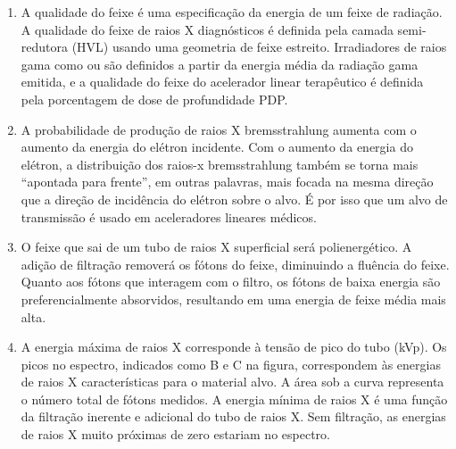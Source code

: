 \documentclass[11pt,a4paper]{article}
\begin{document}
\begin{enumerate}
        \item A qualidade do feixe é uma especificação da energia de um feixe de radiação. A qualidade do feixe de raios X diagnósticos é definida pela camada semi-redutora (HVL) usando uma geometria de feixe estreito. Irradiadores de raios gama como  ou  são definidos a partir da energia média da radiação gama emitida, e a qualidade do feixe do acelerador linear terapêutico é definida pela porcentagem de dose de profundidade PDP.
        
        \item A probabilidade de produção de raios X bremsstrahlung aumenta com o aumento da energia do elétron incidente. Com o aumento da energia do elétron, a distribuição dos raios-x bremsstrahlung também se torna mais “apontada para frente”, em outras palavras, mais focada na mesma direção que a direção de incidência do elétron sobre o alvo. É por isso que um alvo de transmissão é usado em aceleradores lineares médicos.
        
        \item O feixe que sai de um tubo de raios X superficial será polienergético. A adição de filtração removerá os fótons do feixe, diminuindo a fluência do feixe. Quanto aos fótons que interagem com o filtro, os fótons de baixa energia são preferencialmente absorvidos, resultando em uma energia de feixe média mais alta.
        
        \item A energia máxima de raios X corresponde à tensão de pico do tubo (kVp). Os picos no espectro, indicados como B e C na figura, correspondem às energias de raios X características para o material alvo. A área sob a curva representa o número total de fótons medidos. A energia mínima de raios X é uma função da filtração inerente e adicional do tubo de raios X. Sem filtração, as energias de raios X muito próximas de zero estariam no espectro.
        
            \begin{center}
            \end{center}
        

\end{enumerate}
\end{document}
